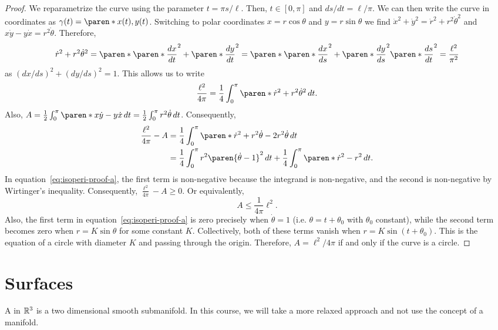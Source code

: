\documentclass[11pt]{penrose}
\begin{document}
\begin{proof}
    We reparametrize the curve using the parameter $t = \pi s / \ell$. Then, $t \in [0, \pi]$ and $ds/dt = \ell/\pi$. We can then write the curve in coordinates as $\gamma(t) = \paren*{x(t), y(t)}$. Switching to polar coordinates $x = r \cos\theta$ and $y = r \sin\theta$ we find $\dot{x}^2 + \dot{y}^2 = \dot{r}^2 + r^2 \dot{\theta}^2$ and $x\dot{y} - y\dot{x} = r^2 \dot{\theta}$. Therefore,
    \begin{equation}
        \dot{r}^2 + r^2 \dot{\theta}^2
        = \paren*{ \paren*{\frac{dx}{dt}}^2 + \paren*{\frac{dy}{dt}}^2 }
        = \paren*{ \paren*{\frac{dx}{ds}}^2 + \paren*{\frac{dy}{ds}}^2 } \paren*{\frac{ds}{dt}}^2
        = \frac{\ell^2}{\pi^2}
    \end{equation}
    as $(dx/ds)^2 + (dy/ds)^2 = 1$. This allows us to write
    \begin{equation}
        \frac{\ell^2}{4\pi} = \frac{1}{4} \int_0^\pi \paren*{\dot{r}^2 + r^2 \dot{\theta}^2} \,dt.
    \end{equation}
    Also, $A = \frac{1}{2} \int_0^\pi \paren*{x\dot{y} - y\dot{x}} \,dt = \frac{1}{2} \int_0^\pi r^2 \dot{\theta} \,dt$. Consequently,
    \begin{align}
        \frac{\ell^2}{4\pi} - A
        &= \frac{1}{4} \int_0^\pi \paren*{\dot{r}^2 + r^2 \dot{\theta} - 2r^2\dot{\theta}} \,dt\\
        &= \frac{1}{4} \int_0^\pi r^2 \paren{\dot{\theta}-1}^2 \,dt + \frac{1}{4}\int_0^\pi \paren*{\dot{r}^2 - r^2} \,dt.
        \label{eq:isoperi-proof-a}
    \end{align}
    In equation~\eqref{eq:isoperi-proof-a}, the first term is non-negative because the integrand is non-negative, and the second is non-negative by Wirtinger's inequality. Consequently, $\frac{\ell^2}{4\pi} - A \geq 0$. Or equivalently,
    \begin{equation}
        A \leq \frac{1}{4\pi} \ell^2.
    \end{equation}
    Also, the first term in equation~\eqref{eq:isoperi-proof-a} is zero precisely when $\dot{\theta} = 1$ (i.e. $\theta = t + \theta_0$ with $\theta_0$ constant), while the second term becomes zero when $r = K \sin\theta$ for some constant $K$. Collectively, both of these terms vanish when $r = K \sin(t + \theta_0)$. This is the equation of a circle with diameter $K$ and passing through the origin. Therefore, $A = \ell^2 / 4\pi$ if and only if the curve is a circle.
\end{proof}

\section{Surfaces}
A  in $\mathbb{R}^3$ is a two dimensional smooth submanifold. In this course, we will take a more relaxed approach and not use the concept of a manifold.
\end{document}
